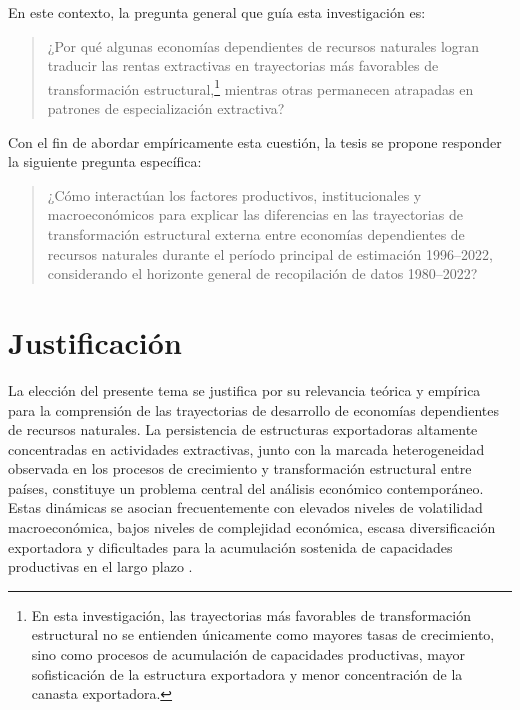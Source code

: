 \documentclass[../../PTFM.tex]{subfiles}
\begin{document}
	En este contexto, la pregunta general que guía esta investigación es:

	\begin{quote}
	¿Por qué algunas economías dependientes de recursos naturales logran traducir las rentas extractivas en trayectorias más favorables de transformación estructural,\footnote{En esta investigación, las trayectorias más favorables de transformación estructural no se entienden únicamente como mayores tasas de crecimiento, sino como procesos de acumulación de capacidades productivas, mayor sofisticación de la estructura exportadora y menor concentración de la canasta exportadora.} mientras otras permanecen atrapadas en patrones de especialización extractiva?
	\end{quote}

	Con el fin de abordar empíricamente esta cuestión, la tesis se propone responder la siguiente pregunta específica:

	\begin{quote}
	¿Cómo interactúan los factores productivos, institucionales y macroeconómicos para explicar las diferencias en las trayectorias de transformación estructural externa entre economías dependientes de recursos naturales durante el período principal de estimación 1996--2022, considerando el horizonte general de recopilación de datos 1980--2022?
	\end{quote}

	\chapter{Justificación}
	\label{chap:justificacion}

	La elección del presente tema se justifica por su relevancia teórica y empírica para la comprensión de las trayectorias de desarrollo de economías dependientes de recursos naturales. La persistencia de estructuras exportadoras altamente concentradas en actividades extractivas, junto con la marcada heterogeneidad observada en los procesos de crecimiento y transformación estructural entre países, constituye un problema central del análisis económico contemporáneo. Estas dinámicas se asocian frecuentemente con elevados niveles de volatilidad macroeconómica, bajos niveles de complejidad económica, escasa diversificación exportadora y dificultades para la acumulación sostenida de capacidades productivas en el largo plazo \parencite{Auty1993,Sachs1995}.
\end{document}
